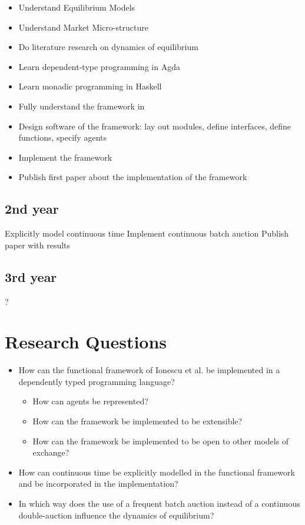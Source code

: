 \documentclass{article}
\begin{document}
\begin{itemize}
\item Understand Equilibrium Models
\item Understand Market Micro-structure
\item Do literature research on dynamics of equilibrium 
\item Learn dependent-type programming in Agda
\item Learn monadic programming in Haskell
\item Fully understand the framework in \cite{Botta20114025}
\item Design software of the framework: lay out modules, define interfaces, define functions, specify agents
\item Implement the framework
\item Publish first paper about the implementation of the framework
\end{itemize}

\subsection{2nd year}
Explicitly model continuous time
Implement continuous batch auction
Publish paper with results

\subsection{3rd year}
?


\section{Research Questions}
\begin{itemize}
\item How can the functional framework of Ionescu et al. be implemented in a dependently typed programming language?
	\begin{itemize}
	\item How can agents be represented?
	\item How can the framework be implemented to be extensible?
	\item How can the framework be implemented to be open to other models of exchange?
	\end{itemize}
\item How can continuous time be explicitly modelled in the functional framework and be incorporated in the implementation?
\item In which way does the use of a frequent batch auction instead of a continuous double-auction influence the dynamics of equilibrium?
\end{itemize}
\end{document}
